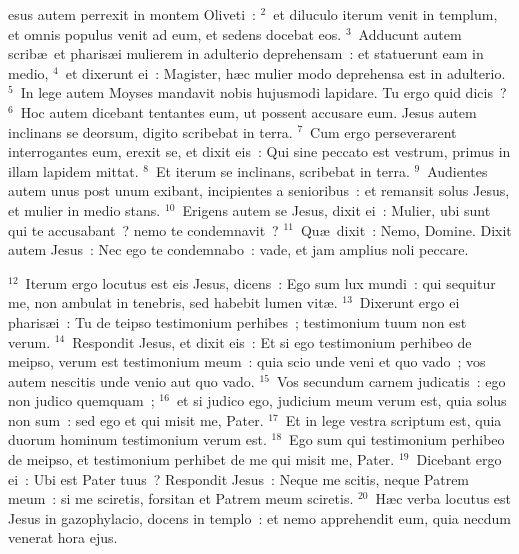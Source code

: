 \bchapter
{}esus autem perrexit in montem Oliveti~:
${}^{2}$~et diluculo iterum venit in templum, et omnis populus venit ad eum, et sedens docebat eos.
${}^{3}$~Adducunt autem scrib\ae\ et pharis\ae i mulierem in adulterio deprehensam~: et statuerunt eam in medio,
${}^{4}$~et dixerunt ei~: Magister, h\ae c mulier modo deprehensa est in adulterio.
${}^{5}$~In lege autem Moyses mandavit nobis hujusmodi lapidare. Tu ergo quid dicis~?
${}^{6}$~Hoc autem dicebant tentantes eum, ut possent accusare eum. Jesus autem inclinans se deorsum, digito scribebat in terra.
${}^{7}$~Cum ergo perseverarent interrogantes eum, erexit se, et dixit eis~: Qui sine peccato est vestrum, primus in illam lapidem mittat.
${}^{8}$~Et iterum se inclinans, scribebat in terra.
${}^{9}$~Audientes autem unus post unum exibant, incipientes a senioribus~: et remansit solus Jesus, et mulier in medio stans.
${}^{10}$~Erigens autem se Jesus, dixit ei~: Mulier, ubi sunt qui te accusabant~? nemo te condemnavit~?
${}^{11}$~Qu\ae\ dixit~: Nemo, Domine. Dixit autem Jesus~: Nec ego te condemnabo~: vade, et jam amplius noli peccare.


${}^{12}$~Iterum ergo locutus est eis Jesus, dicens~: Ego sum lux mundi~: qui sequitur me, non ambulat in tenebris, sed habebit lumen vit\ae .
${}^{13}$~Dixerunt ergo ei pharis\ae i~: Tu de teipso testimonium perhibes~; testimonium tuum non est verum.
${}^{14}$~Respondit Jesus, et dixit eis~: Et si ego testimonium perhibeo de meipso, verum est testimonium meum~: quia scio unde veni et quo vado~; vos autem nescitis unde venio aut quo vado.
${}^{15}$~Vos secundum carnem judicatis~: ego non judico quemquam~;
${}^{16}$~et si judico ego, judicium meum verum est, quia solus non sum~: sed ego et qui misit me, Pater.
${}^{17}$~Et in lege vestra scriptum est, quia duorum hominum testimonium verum est.
${}^{18}$~Ego sum qui testimonium perhibeo de meipso, et testimonium perhibet de me qui misit me, Pater.
${}^{19}$~Dicebant ergo ei~: Ubi est Pater tuus~? Respondit Jesus~: Neque me scitis, neque Patrem meum~: si me sciretis, forsitan et Patrem meum sciretis.
${}^{20}$~H\ae c verba locutus est Jesus in gazophylacio, docens in templo~: et nemo apprehendit eum, quia necdum venerat hora ejus.


